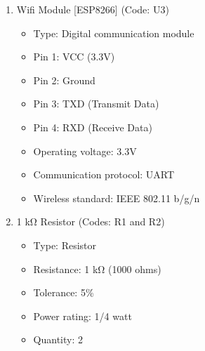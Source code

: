 \documentclass[11pt]{article}
\begin{document}
\begin{enumerate}
\begin{itemize}
	      \end{itemize}
	\item Wifi Module [ESP8266] (Code: U3)
	      \begin{itemize}
		      \item Type: Digital communication module
		      \item Pin 1: VCC (3.3V)
		      \item Pin 2: Ground
		      \item Pin 3: TXD (Transmit Data)
		      \item Pin 4: RXD (Receive Data)
		      \item Operating voltage: 3.3V
		      \item Communication protocol: UART
		      \item Wireless standard: IEEE 802.11 b/g/n
	      \end{itemize}
	\item 1 kΩ Resistor (Codes: R1 and R2)

	      \begin{itemize}
		      \item Type: Resistor
		      \item Resistance: 1 kΩ (1000 ohms)
		      \item Tolerance: 5\%
		      \item Power rating: 1/4 watt
		      \item Quantity: 2
	      \end{itemize}

\end{enumerate}
\end{document}
